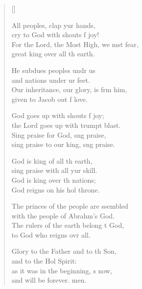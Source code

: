 \settowidth{\versewidth}{For the Lord, the Most High, we must fear, *}
\begin{verse}[\versewidth]
  \begin{patverse}
    All peoples, clap yur hands,\Med\\
cry to God with shouts f joy!\\
For the Lord, the Most High, we mst fear,\Med\\
great king over all th earth.

He subdues peoples undr us\Med\\
and nations under ur feet.\\
Our inheritance, our glory, is frm him,\Med\\
given to Jacob out f love.

God goes up with shouts f joy;\Med\\
the Lord goes up with trumpt blast.\\
Sing praise for God, s\pointup{\i}ng praise,\Med\\
sing praise to our king, s\pointup{\i}ng praise.

God is king of all th earth,\Med\\
sing praise with all yur skill.\\
God is king over th nations;\Med\\
God reigns on his hol throne.

The princes of the people are ssembled\Med\\
with the people of Abrahm’s God.\\
The rulers of the earth belong t God,\Med\\
to God who reigns ovr all.

Glory to the Father and to th Son,\Med\\
and to the Hol Spirit:\\
as it was in the beginning, \pointup{\i}s now,\Med\\
and will be forever. men. 
  \end{patverse}
\end{verse}
